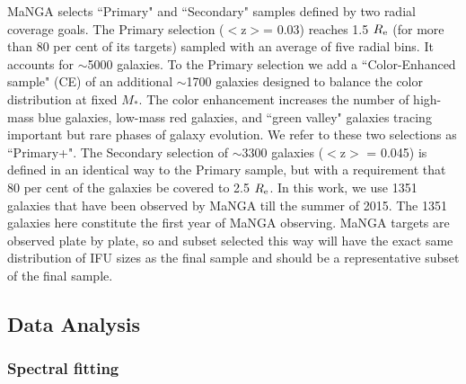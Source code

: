 \documentclass[a4paper,fleqn,usenatbib]{mnras}
\begin{document}
MaNGA selects ``Primary" and ``Secondary" samples defined by two radial coverage goals. The Primary selection 
($<$z$>$= 0.03) reaches 1.5 $R_{\rm e}$ (for more than 80 per cent of its targets) sampled with an average of five radial bins. 
It accounts for $\sim$5000 galaxies. To the Primary selection we add a ``Color-Enhanced sample" (CE) of an additional 
$\sim$1700 galaxies designed to balance the color distribution at fixed $M_*$. The color enhancement increases 
the number of high-mass blue galaxies, low-mass red galaxies, and ``green valley" galaxies tracing important but 
rare phases of galaxy evolution. We refer to these two selections as ``Primary+". The Secondary selection of $\sim$3300 
galaxies ($<$z$>$ = 0.045) is defined in an identical way to the Primary sample, but with a requirement that 80 per cent of 
the galaxies be covered to 2.5 $R_{\rm e}$. In this work, we use 1351 galaxies that have been observed by MaNGA till the summer
of 2015. The 1351 galaxies here constitute the first year of MaNGA observing. MaNGA targets are observed plate by plate, so and subset selected this way will have  the exact same distribution of IFU sizes as the final sample and should be a representative subset of the final sample.


\subsection{Data Analysis}
\subsubsection{Spectral fitting}
\end{document}
